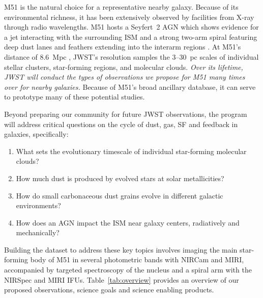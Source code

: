 \documentclass[12pt]{article}
\begin{document}
M51 is the natural choice for a representative nearby galaxy. Because of its environmental richness, it has been extensively observed by facilities from X-ray through radio wavelengths. M51 hosts a Seyfert~2 AGN \citep{ho1997} which shows evidence for a jet interacting with the surrounding ISM \citep{querejeta2016} and a strong two-arm spiral  featuring deep dust lanes and feathers extending into the interarm regions \citep{lavigne2006}. At M51's distance of 8.6~Mpc \citep{mcquinn2016}, JWST's resolution samples the 3--30~pc scales of individual stellar clusters, star-forming regions, and molecular clouds. {\em Over its lifetime, JWST will conduct the types of observations we propose for M51 many times over for nearby galaxies.} Because of M51's broad ancillary database, it can serve to prototype many of these potential studies. 

Beyond preparing our community for future JWST observations, the program will address critical questions on the cycle of dust, gas, SF and feedback in galaxies, specifically: 
\vspace{-0.25in}
\begin{enumerate}
    \item What sets the evolutionary timescale of individual star-forming molecular clouds?\vspace{-0.1in}
    \item How much dust is produced by evolved stars at solar metallicities?\vspace{-0.1in}
    \item How do small carbonaceous dust grains evolve in different galactic environments?\vspace{-0.1in}
    \item How does an AGN impact the ISM near galaxy centers, radiatively and mechanically?\vspace{-0.1in}
\end{enumerate}

\vspace{0.05in}

\noindent Building the dataset to address these key topics involves imaging the main star-forming body of M51 in several photometric bands with NIRCam and MIRI, accompanied by targeted spectroscopy of the nucleus and a spiral arm with the NIRSpec and MIRI IFUs. Table~\ref{tab:overview} provides an overview of our proposed observations, science goals and science enabling products.
\end{document}
